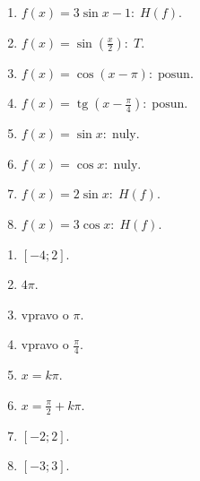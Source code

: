 \documentclass[11pt,a4paper]{article}
\begin{document}
\begin{zadaniReseniBox}[title={Domácí úkol}]
\begin{enumerate}[label=\alph*)]
\item $f(x)=3\sin x-1:\;H(f)$.
\item $f(x)=\sin(\frac x2):\;T$.
\item $f(x)=\cos(x-\pi):\;\text{posun}$.
\item $f(x)=\operatorname{tg}(x-\frac{\pi}{4}):\;\text{posun}$.
\item $f(x)=\sin x:\;\text{nuly}$.
\item $f(x)=\cos x:\;\text{nuly}$.
\item $f(x)=2\sin x:\; H(f)$.
\item $f(x)=3\cos x:\;H(f)$.
\end{enumerate}
\tcblower
\begin{enumerate}[label=\alph*)]
\item $[-4;2]$.
\item $4\pi$.
\item vpravo o $\pi$.
\item vpravo o $\frac{\pi}{4}$.
\item $x=k\pi$.
\item $x=\frac{\pi}{2}+k\pi$.
\item $[-2;2]$.
\item $[-3;3]$.
\end{enumerate}
\end{zadaniReseniBox}
\end{document}
